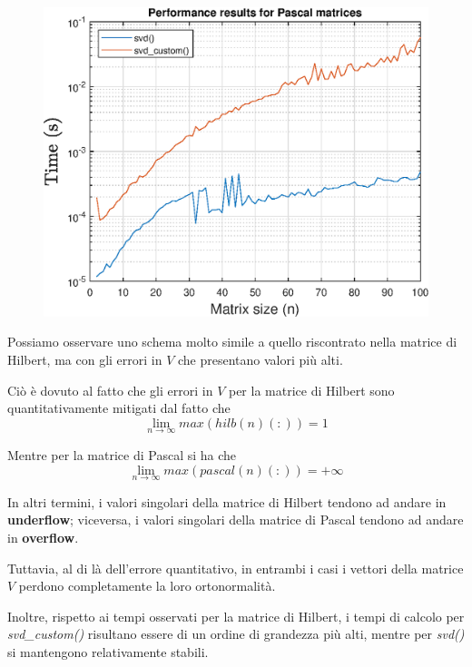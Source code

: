 \begin{figure}[!htb]
\includegraphics[width=\linewidth]{imgs/09_-_Performance_results_for_Pascal_matrices.eps}
\endminipage
\end{figure}

Possiamo osservare uno schema molto simile a quello riscontrato nella matrice di 
Hilbert, ma con gli errori in $V$ che presentano valori più alti.

Ciò è dovuto al fatto che gli errori in $V$ per la matrice di Hilbert sono 
quantitativamente mitigati dal fatto che
\begin{equation*}
	\lim_{n \to \infty} max(hilb(n)(:)) = 1
\end{equation*}

Mentre per la matrice di Pascal si ha che
\begin{equation*}
	\lim_{n \to \infty} max(pascal(n)(:)) = +\infty
\end{equation*}

In altri termini, i valori singolari della matrice di Hilbert tendono ad andare 
in \textbf{underflow}; viceversa, i valori singolari della matrice di Pascal 
tendono ad andare in \textbf{overflow}.


Tuttavia, al di là dell'errore quantitativo, in entrambi i casi i vettori della 
matrice $V$ perdono completamente la loro ortonormalità.

Inoltre, rispetto ai tempi osservati per la matrice di Hilbert, i tempi di 
calcolo per \textit{svd\_custom()} risultano essere di un ordine di grandezza 
più alti, mentre per \textit{svd()} si mantengono relativamente stabili.


